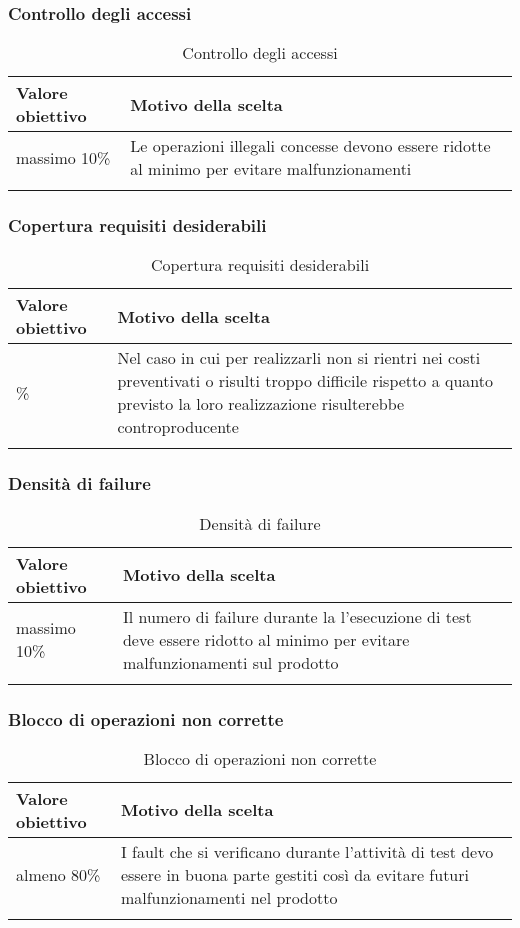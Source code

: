 \documentclass[../PianoDiQualifica_v3.0.0.tex]{subfiles}
\begin{document}
		\subsubsection{Controllo degli accessi}
			\begin{longtable}[c] { >{\centering\arraybackslash}p{4cm} p{7cm} }
				\toprule
				\centerline{\textbf{Valore obiettivo}} & \centerline{\textbf{Motivo della scelta}} \\
				\midrule
					massimo 10\% & Le operazioni illegali concesse devono essere ridotte al minimo per evitare malfunzionamenti \\
				\bottomrule
				\caption{Controllo degli accessi}
			\end{longtable}

		\subsubsection{Copertura requisiti desiderabili}
			\begin{longtable}[c] { >{\centering\arraybackslash}p{4cm} p{7cm} }
				\toprule
				\centerline{\textbf{Valore obiettivo}} & \centerline{\textbf{Motivo della scelta}} \\
				\midrule
					80\% &	Nel caso in cui per realizzarli non si rientri nei costi preventivati o risulti troppo difficile rispetto a quanto previsto la loro realizzazione risulterebbe controproducente \\
				\bottomrule
				\caption{Copertura requisiti desiderabili}
			\end{longtable}

		\subsubsection{Densità di failure}
			\begin{longtable}[c] { >{\centering\arraybackslash}p{4cm} p{7cm} }
				\toprule
				\centerline{\textbf{Valore obiettivo}} & \centerline{\textbf{Motivo della scelta}} \\
				\midrule
					massimo 10\% & Il numero di failure durante la l'esecuzione di test deve essere ridotto al minimo per evitare malfunzionamenti sul prodotto \\
				\bottomrule
				\caption{Densità di failure}
			\end{longtable}

		\subsubsection{Blocco di operazioni non corrette}
			\begin{longtable}[c] { >{\centering\arraybackslash}p{4cm} p{7cm} }
				\toprule
				\centerline{\textbf{Valore obiettivo}} & \centerline{\textbf{Motivo della scelta}} \\
				\midrule
					almeno 80\% & I fault che si verificano durante l'attività di test devo essere in buona parte gestiti così da evitare futuri malfunzionamenti nel prodotto \\
				\bottomrule
				\caption{Blocco di operazioni non corrette}
			\end{longtable}
\end{document}
